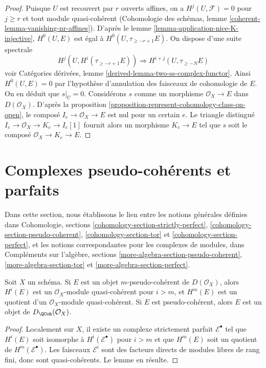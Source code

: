 \begin{proof}
Puisque $U$ est recouvert par $r$ ouverts affines, on a $H^j(U, \mathcal{F}) = 0$
pour $j \geq r$ et tout module quasi-cohérent
(Cohomologie des schémas, lemme \ref{coherent-lemma-vanishing-nr-affines}).
D'après le lemme \ref{lemma-application-nice-K-injective}, $H^0(U, E)$
est égal à $H^0(U, \tau_{\geq -r + 1}E)$. On dispose d'une
suite spectrale
$$
H^j(U, H^i(\tau_{\geq -r + 1}E)) \Rightarrow H^{i + j}(U, \tau_{\geq -N}E)
$$
voir Catégories dérivées, lemme \ref{derived-lemma-two-ss-complex-functor}.
Ainsi $H^0(U, E) = 0$ par l'hypothèse d'annulation des faisceaux de cohomologie de $E$.
On en déduit que $s|_U = 0$.
Considérons $s$ comme un morphisme $\mathcal{O}_X \to E$ dans $D(\mathcal{O}_X)$.
D'après la proposition \ref{proposition-represent-cohomology-class-on-open},
le composé $I_e \to \mathcal{O}_X \to E$ est nul pour un certain $e$.
Le triangle distingué $I_e \to \mathcal{O}_X \to K_e \to I_e[1]$
fournit alors un morphisme $K_e \to E$ tel que $s$ soit le composé
$\mathcal{O}_X \to K_e \to E$.
\end{proof}

\section{Complexes pseudo-cohérents et parfaits}
\label{section-spell-out}

\noindent
Dans cette section, nous établissons le lien entre les notions
générales définies dans
Cohomologie, sections \ref{cohomology-section-strictly-perfect},
\ref{cohomology-section-pseudo-coherent},
\ref{cohomology-section-tor} et
\ref{cohomology-section-perfect},
et les notions correspondantes pour les complexes de modules, dans
Compléments sur l'algèbre, sections
\ref{more-algebra-section-pseudo-coherent},
\ref{more-algebra-section-tor} et
\ref{more-algebra-section-perfect}.

\begin{lemma}
\label{lemma-pseudo-coherent}
Soit $X$ un schéma. Si $E$ est un objet $m$-pseudo-cohérent
de $D(\mathcal{O}_X)$, alors $H^i(E)$ est un
$\mathcal{O}_X$-module quasi-cohérent pour $i > m$, et $H^m(E)$ est un quotient
d'un $\mathcal{O}_X$-module quasi-cohérent.
Si $E$ est pseudo-cohérent, alors $E$ est un objet de
$D_\QCoh(\mathcal{O}_X)$.
\end{lemma}

\begin{proof}
Localement sur $X$, il existe un complexe strictement parfait $\mathcal{E}^\bullet$
tel que $H^i(E)$ soit isomorphe à $H^i(\mathcal{E}^\bullet)$ pour $i > m$
et que $H^m(E)$ soit un quotient de $H^m(\mathcal{E}^\bullet)$. Les faisceaux
$\mathcal{E}^i$ sont des facteurs directs de modules libres de rang fini,
donc sont quasi-cohérents. Le lemme en résulte.
\end{proof}

